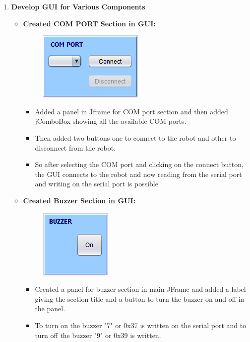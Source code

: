 \documentclass{article}
\begin{document}
\begin{enumerate}
\begin{itemize}
		\end{itemize}
		\item \textbf{\large Develop GUI for Various Components}
		\begin{itemize}
			\item \textbf{Created COM PORT Section in GUI:}
			\begin{figure}[h]
				\begin{center}
					\includegraphics[scale=1]{comport.png}
				\end{center}
			\end{figure}
			\begin{itemize}
				\item Added a panel in Jframe for COM port section and then added jComboBox showing all the available COM ports.
				\item Then added two buttons one to connect to the robot and other to disconnect from the robot.
				\item So after selecting the COM port and clicking on the connect button, the GUI connects to the robot and now reading from the serial port and writing on the serial port is possible
			\end{itemize}
			\item \textbf{Created Buzzer Section in GUI:}
			\begin{figure}[h]
				\begin{center}
					\includegraphics[scale=1]{buzzer.png}
				\end{center}
			\end{figure}
			\begin{itemize}
				\item Created a panel for buzzer section in main JFrame and added a label giving the section title and a button to turn the buzzer on and off in the panel.
				\item To turn on the buzzer "7" or 0x37 is written on the serial port and to turn off the buzzer "9" or 0x39 is written.   

\end{itemize}
\end{itemize}
\end{enumerate}
\end{document}
